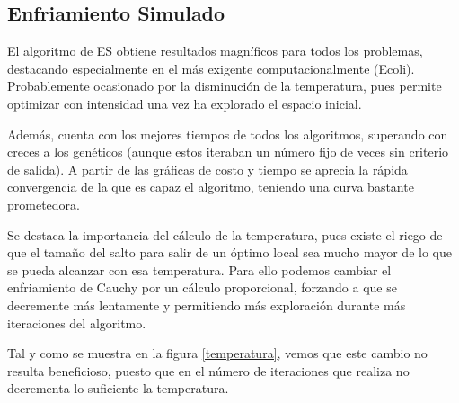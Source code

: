\newpage

\subsection{Enfriamiento Simulado}

El algoritmo de ES obtiene resultados magníficos para todos los problemas, destacando especialmente en el más exigente computacionalmente (Ecoli). Probablemente ocasionado por la disminución de la temperatura, pues permite optimizar con intensidad una vez ha explorado el espacio inicial.

Además, cuenta con los mejores tiempos de todos los algoritmos, superando con creces a los genéticos (aunque estos iteraban un número fijo de veces sin criterio de salida). A partir de las gráficas de costo y tiempo se aprecia la rápida convergencia de la que es capaz el algoritmo, teniendo una curva bastante prometedora.

\vspace{\baselineskip}

Se destaca la importancia del cálculo de la temperatura, pues existe el riego de que el tamaño del salto para salir de un óptimo local sea mucho mayor de lo que se pueda alcanzar con esa temperatura.
Para ello podemos cambiar el enfriamiento de Cauchy por un cálculo proporcional, forzando a que se decremente más lentamente y permitiendo más exploración durante más iteraciones del algoritmo.

Tal y como se muestra en la figura \ref{temperatura}, vemos que este cambio no resulta beneficioso, puesto que en el número de iteraciones que realiza no decrementa lo suficiente la temperatura.


